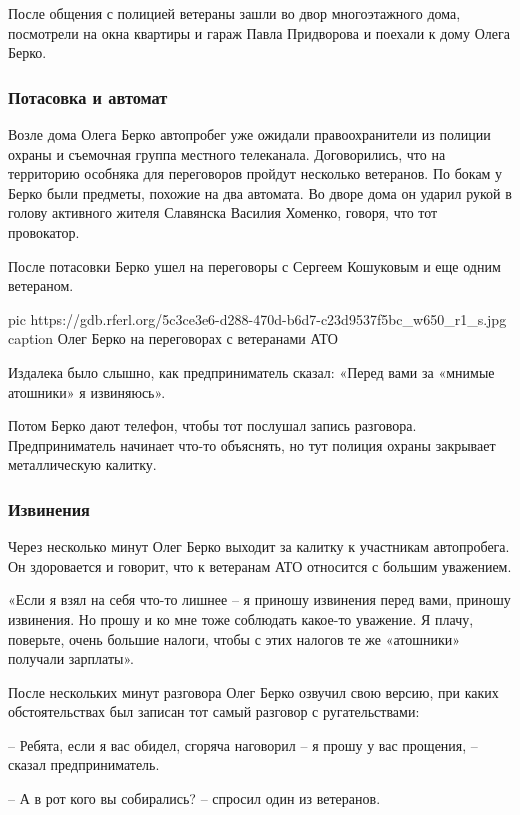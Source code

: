 После общения с полицией ветераны зашли во двор многоэтажного дома, посмотрели
на окна квартиры и гараж Павла Придворова и поехали к дому Олега Берко.

\subsubsection{Потасовка и автомат}

Возле дома Олега Берко автопробег уже ожидали правоохранители из полиции охраны
и съемочная группа местного телеканала. Договорились, что на территорию
особняка для переговоров пройдут несколько ветеранов. По бокам у Берко были
предметы, похожие на два автомата. Во дворе дома он ударил рукой в голову
активного жителя Славянска Василия Хоменко, говоря, что тот провокатор.

После потасовки Берко ушел на переговоры с Сергеем Кошуковым и еще одним
ветераном.

\ifcmt
  pic https://gdb.rferl.org/5c3ce3e6-d288-470d-b6d7-c23d9537f5bc_w650_r1_s.jpg
  caption Олег Берко на переговорах с ветеранами АТО
\fi

Издалека было слышно, как предприниматель сказал: «Перед вами за «мнимые
атошники» я извиняюсь».

Потом Берко дают телефон, чтобы тот послушал запись разговора. Предприниматель
начинает что-то объяснять, но тут полиция охраны закрывает металлическую
калитку.

\subsubsection{Извинения}

Через несколько минут Олег Берко выходит за калитку к участникам автопробега.
Он здоровается и говорит, что к ветеранам АТО относится с большим уважением.

«Если я взял на себя что-то лишнее – я приношу извинения перед вами, приношу
извинения. Но прошу и ко мне тоже соблюдать какое-то уважение. Я плачу,
поверьте, очень большие налоги, чтобы с этих налогов те же «атошники» получали
зарплаты».

После нескольких минут разговора Олег Берко озвучил свою версию, при каких
обстоятельствах был записан тот самый разговор с ругательствами:

– Ребята, если я вас обидел, сгоряча наговорил – я прошу у вас прощения, –
сказал предприниматель.

– А в рот кого вы собирались? – спросил один из ветеранов.

